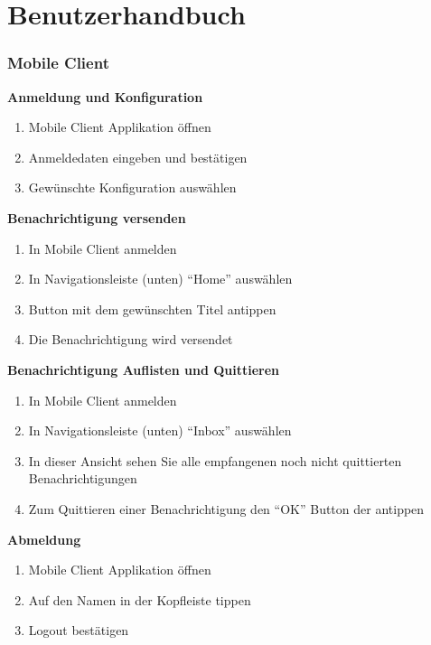 \section{Benutzerhandbuch}

\subsubsection*{Mobile Client}

\textbf{Anmeldung und Konfiguration}

\begin{enumerate}
    \item Mobile Client Applikation öffnen
    \item Anmeldedaten eingeben und bestätigen
    \item Gewünschte Konfiguration auswählen
\end{enumerate}

\textbf{Benachrichtigung versenden}

\begin{enumerate}
    \item In Mobile Client anmelden
    \item In Navigationsleiste (unten) ``Home'' auswählen
    \item Button mit dem gewünschten Titel antippen
    \item Die Benachrichtigung wird versendet
\end{enumerate}

\textbf{Benachrichtigung Auflisten und Quittieren}

\begin{enumerate}
    \item In Mobile Client anmelden
    \item In Navigationsleiste (unten) ``Inbox'' auswählen
    \item In dieser Ansicht sehen Sie alle empfangenen noch nicht quittierten Benachrichtigungen
    \item Zum Quittieren einer Benachrichtigung den ``OK'' Button der antippen
\end{enumerate}

\textbf{Abmeldung}

\begin{enumerate}
    \item Mobile Client Applikation öffnen
    \item Auf den Namen in der Kopfleiste tippen
    \item Logout bestätigen
\end{enumerate}

